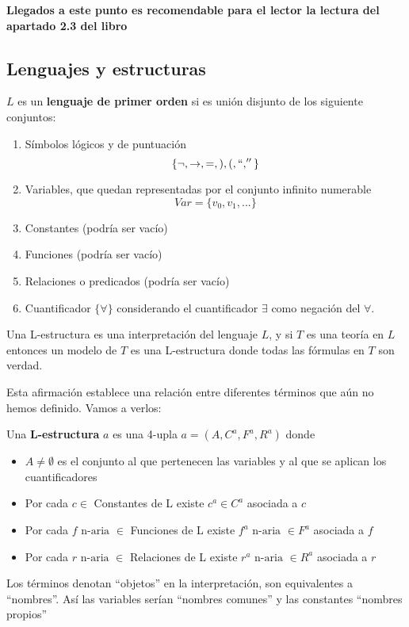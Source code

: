 \textbf{Llegados a este punto es recomendable para el lector la lectura del apartado 2.3 del libro}

\subsection{Lenguajes y estructuras}

\begin{defn}
$L$ es un \textbf{lenguaje de primer orden} si es unión disjunto de los siguiente conjuntos:
\begin{enumerate}
\item Símbolos lógicos y de puntuación
\[\{\neg, \to , = , ), (, ``,''\}\]
\item Variables, que quedan representadas por el conjunto infinito numerable
\[Var = \{v_0,v_1,...\}\]
\item Constantes (podría ser vacío)
\item Funciones (podría ser vacío)
\item Relaciones o predicados (podría ser vacío)
\item Cuantificador $\{\forall \}$ considerando el cuantificador $\exists$ como negación del $\forall$.
\end{enumerate}
\end{defn}

Una L-estructura es una interpretación del lenguaje $L$, y si $T$ es una teoría en $L$ entonces un modelo de $T$ es una L-estructura donde todas las fórmulas en $T$ son verdad.

Esta afirmación establece una relación entre diferentes términos que aún no hemos definido. Vamos a verlos:

\begin{defn}[L-estructura]
Una \textbf{L-estructura} $a$ es una 4-upla $a=(A,C^a,F^a,R^a)$ donde 
\begin{itemize}
\item $A\neq \emptyset$ es el conjunto al que pertenecen las variables y al que se aplican los cuantificadores
\item Por cada $c \in $ Constantes de L existe $c^a\in C^a$ asociada a $c$
\item Por cada $f \text{ n-aria } \in $ Funciones de L existe $f^a\text{ n-aria }\in F^a$ asociada a $f$
\item Por cada $r \text{ n-aria }\in $ Relaciones de L existe $r^a \text{ n-aria }\in R^a$ asociada a $r$
\end{itemize}
Los términos denotan ``objetos'' en la interpretación, son equivalentes a ``nombres''. Así las variables serían ``nombres comunes'' y las constantes ``nombres propios''
\end{defn}

